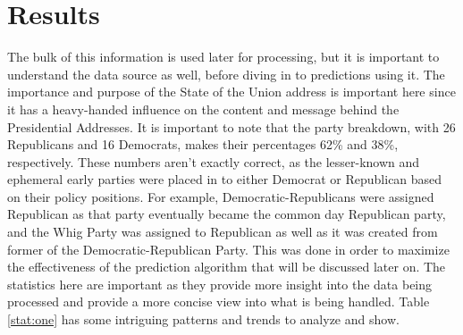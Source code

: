 \section{Results}
The bulk of this information is used later for processing, but it is important to understand the data source as well, before diving in to predictions using it.
The importance and purpose of the State of the Union address is important here since it has a heavy-handed influence on the content and message behind the Presidential Addresses.
It is important to note that the party breakdown, with 26 Republicans and 16 Democrats, makes their percentages 62\% and 38\%, respectively.
These numbers aren't exactly correct, as the lesser-known and ephemeral early parties were placed in to either Democrat or Republican based on their policy positions.
For example, Democratic-Republicans were assigned Republican as that party eventually became the common day Republican party, and the Whig Party was assigned to Republican as well as it was created from former of the Democratic-Republican Party.
This was done in order to maximize the effectiveness of the prediction algorithm that will be discussed later on.
The statistics here are important as they provide more insight into the data being processed and provide a more concise view into what is being handled.
Table \ref{stat:one} has some intriguing patterns and trends to analyze and show.

